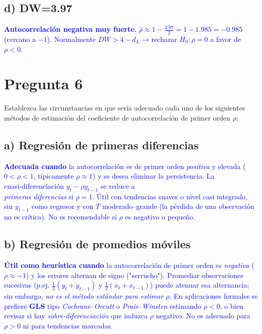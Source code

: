 \documentclass[10pt]{article}
\begin{document}
\subsection{d) DW=3.97}
\textcolor{blue}{
\textbf{Autocorrelación negativa muy fuerte.} $\hat\rho\approx1-\tfrac{3.97}{2}=1-1.985=-0.985$ (cercano a $-1$). Normalmente $DW>4-d_L$ → rechazar $H_0:\rho=0$ a favor de $\rho<0$.
}
\section{Pregunta 6}
Establezca las circunstancias en que sería adecuado cada uno de los siguientes métodos de estimación del coeficiente de autocorrelación de primer orden $\rho$:

\subsection{a) Regresión de primeras diferencias}
\textcolor{blue}{
\textbf{Adecuada cuando} la autocorrelación es de primer orden \emph{positiva} y elevada ($0<\rho<1$, típicamente $\rho\approx1$) y se desea eliminar la persistencia. La cuasi‑diferenciación $y_t-\rho y_{t-1}$ se reduce a \\ \emph{primeras diferencias} si $\rho=1$. Útil con tendencias suaves o nivel casi integrado, sin $y_{t-1}$ como regresor y con $T$ moderado–grande (la pérdida de una observación no es crítica). No es recomendable si $\rho$ es negativo o pequeño.
}

\subsection{b) Regresión de promedios móviles}
\textcolor{blue}{
\textbf{Útil como heurística cuando} la autocorrelación de primer orden es \emph{negativa} ($\rho\approx-1$) y los errores alternan de signo ("serrucho"). Promediar observaciones sucesivas (p.ej. $\tfrac{1}{2}(y_t+y_{t-1})$ y $\tfrac{1}{2}(x_t+x_{t-1})$) puede atenuar esa alternancia; sin embargo, \emph{no es el método estándar para estimar} $\rho$. En aplicaciones formales se prefiere \textbf{GLS} tipo \emph{Cochrane--Orcutt} o \emph{Prais--Winsten} estimando $\rho<0$, o bien revisar si hay \emph{sobre‑diferenciación} que induzca $\rho$ negativo. No es adecuado para $\rho>0$ ni para tendencias marcadas.
}
\end{document}
